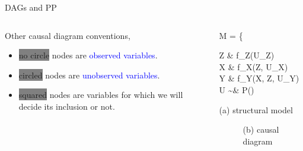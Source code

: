 %
%
\begin{frame}
	{DAGs and PP}
	\begin{columns}
		\begin{column}{0.5\textwidth}
			Other causal diagram conventions,
			\begin{itemize}
				\item \colorbox{gray}{no circle} nodes are \textcolor{blue}{observed variables}.
				\item \colorbox{gray}{circled} nodes are \textcolor{blue}{unobserved variables}.
				\item \colorbox{gray}{squared} nodes are variables for which we will decide its inclusion or not.
			\end{itemize}
		\end{column}
		\begin{column}{0.5\textwidth}  
			\begin{equ}
				M = \left\{ \begin{aligned} 
					Z \leftarrow & \; f_{Z}(U_{Z}) \\
					X \leftarrow & \; f_{X}(Z, U_{X}) \\
					Y \leftarrow & \; f_{Y}(X, Z, U_{Y}) \\
					U \sim & \; P()
				\end{aligned} \right
				\caption*{(a) structural model}
			\end{equ}
			\begin{figure}
				\caption*{(b) causal diagram }
			\end{figure}
		\end{column}
	\end{columns}
\end{frame}
